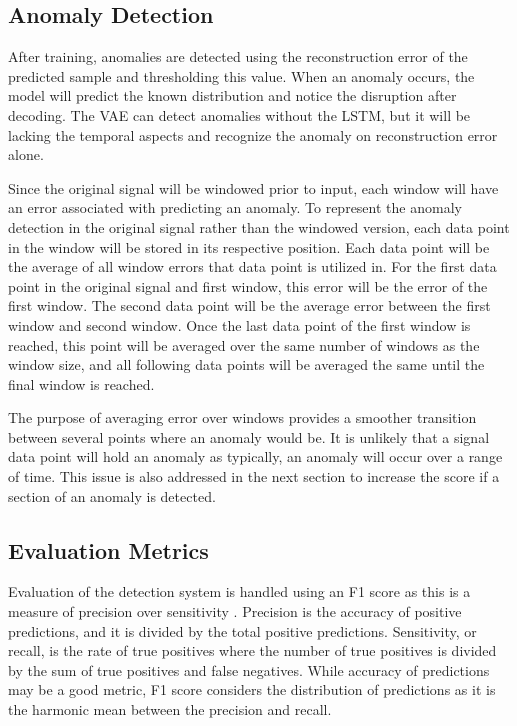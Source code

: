 \documentclass[conference]{IEEEtran}
\begin{document}
\subsection{Anomaly Detection}
After training, anomalies are detected using the reconstruction error of the predicted sample and thresholding this value. When an anomaly occurs, the model will predict the known distribution and notice the disruption after decoding. The VAE can detect anomalies without the LSTM, but it will be lacking the temporal aspects and recognize the anomaly on reconstruction error alone.

Since the original signal will be windowed prior to input, each window will have an error associated with predicting an anomaly. To represent the anomaly detection in the original signal rather than the windowed version, each data point in the window will be stored in its respective position. Each data point will be the average of all window errors that data point is utilized in. For the first data point in the original signal and first window, this error will be the error of the first window. The second data point will be the average error between the first window and second window. Once the last data point of the first window is reached, this point will be averaged over the same number of windows as the window size, and all following data points will be averaged the same until the final window is reached.

The purpose of averaging error over windows provides a smoother transition between several points where an anomaly would be. It is unlikely that a signal data point will hold an anomaly as typically, an anomaly will occur over a range of time. This issue is also addressed in the next section to increase the score if a section of an anomaly is detected.

\subsection{Evaluation Metrics}
Evaluation of the detection system is handled using an F1 score as this is a measure of precision over sensitivity \cite{f1_page}. Precision is the accuracy of positive predictions, and it is divided by the total positive predictions. Sensitivity, or recall, is the rate of true positives where the number of true positives is divided by the sum of true positives and false negatives. While accuracy of predictions may be a good metric, F1 score considers the distribution of predictions as it is the harmonic mean between the precision and recall.
\end{document}
